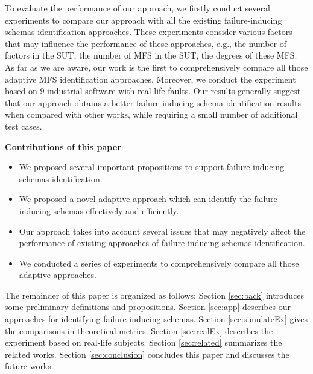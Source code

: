 \documentclass{sig-alternate-05-2015}
\begin{document}
To evaluate the performance of our approach, we firstly conduct several experiments to compare our approach with all the existing failure-inducing schemas identification approaches. These experiments consider various factors that may influence the performance of these approaches, e.g., the number of factors in the SUT, the number of MFS in the SUT, the degrees of these MFS. As far as we are aware, our work is the first to comprehensively compare all those adaptive MFS identification approaches. Moreover, we conduct the experiment based on 9 industrial software with real-life faults. Our results generally suggest that our approach obtains a better failure-inducing schema identification results when compared with other works, while requiring a small number of additional test cases.

\textbf{Contributions of this paper}:
\begin{itemize}
  \item We proposed several important propositions to support failure-inducing schemas identification.

  \item We proposed a novel adaptive approach which can identify the failure-inducing schemas effectively and efficiently.
  \item Our approach takes into account several issues that may negatively affect the performance of existing approaches of failure-inducing schemas identification.

  \item We conducted a series of experiments to comprehensively compare all those adaptive approaches.

\end{itemize}

The remainder of this paper is organized as follows: Section \ref{sec:back} introduces some preliminary definitions and propositions.
 Section \ref{sec:app} describes our approaches for identifying failure-inducing schemas. Section \ref{sec:simulateEx} gives the comparisons in theoretical metrics. Section \ref{sec:realEx} describes the experiment based on real-life subjects. Section \ref{sec:related} summarizes the related works. Section \ref{sec:conclusion} concludes this paper and discusses the future works.
\end{document}
